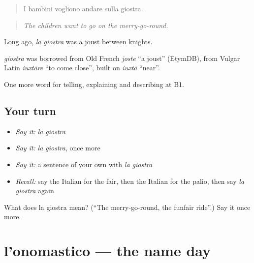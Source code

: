 \begin{quote}
I bambini vogliono andare sulla giostra.
\end{quote}

\begin{quote}
\emph{The children want to go on the merry-go-round.}
\end{quote}

Long ago, \emph{la giostra} was a joust between knights.

\begin{cousinweb}
\emph{giostra} was borrowed from Old French \emph{joste} \textquotedblleft{}a joust\textquotedblright{} (EtymDB), from Vulgar Latin \emph{iuxtāre} \textquotedblleft{}to come close\textquotedblright{}, built on \emph{iuxtā} \textquotedblleft{}near\textquotedblright{}.
\end{cousinweb}

\begin{grammarlens}[title={What you've built}]
One more word for telling, explaining and describing at B1.
\end{grammarlens}

\subsection*{Your turn}
\begin{itemize}
\raggedright
  \item \emph{Say it:} \emph{la giostra}
  \item \emph{Say it:} \emph{la giostra}, once more
  \item \emph{Say it:} a sentence of your own with \emph{la giostra}
  \item \emph{Recall:} say the Italian for the fair, then the Italian for the palio, then say \emph{la giostra} again
\end{itemize}

\begin{tcolorbox}[breakable,colback=teal!4,colframe=teal!35!black,title={Before you move on}]
What does la giostra mean? (\textquotedblleft{}The merry-go-round, the funfair ride\textquotedblright{}.) Say it once more.
\end{tcolorbox}
\section[l'onomastico]{l'onomastico — the name day}

\label{lesson:IT-C320-onomastico}



